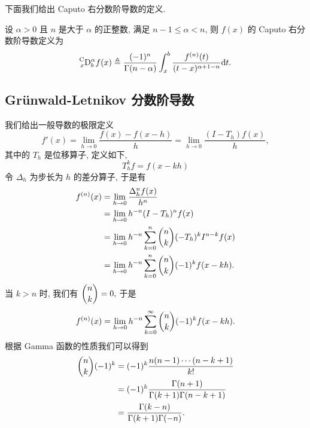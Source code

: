 \documentclass{ecnumaster}
\begin{document}
下面我们给出 Caputo 右分数阶导数的定义.
\begin{definition}
  设 $\alpha > 0$ 且 $n$ 是大于 $\alpha$ 的正整数,
  满足 $n - 1 \le \alpha < n$,   则 $f(x)$ 的 Caputo 右分数阶导数定义为
  $$
    \prescript{{\mathrm{C}}}{x} {\mathrm{D}}_b^{\alpha} f(x)
    \triangleq \frac{(-1)^n}{\Gamma (n-\alpha)}
    \int _x^b \frac{f^{(n)}(t)}{(t-x)^{\alpha + 1 - n}} \mathrm{d}t.
  $$
\end{definition}

\subsection{Gr\"unwald-Letnikov 分数阶导数}
我们给出一般导数的极限定义
\begin{equation}\nonumber
  f'(x) = \lim _{h \to 0} \frac{f(x) - f(x-h)}{h} = \lim _{h \to 0}\frac{(I - T_h)f(x)}{h},
\end{equation}
其中的 $T_h$ 是位移算子, 定义如下,
\begin{equation}\nonumber
  T_h^k f = f(x-kh)
\end{equation}
令 $\Delta _h$ 为步长为 $h$ 的差分算子, 于是有
\begin{equation}
  \begin{split}\nonumber
  f^{(n)}(x) &= \lim _{h \to 0}\frac{\Delta _h^n f(x)}{h^n}\\
             &= \lim _{h \to 0} h^{-n}(I - T_h)^n f(x)\\
             &= \lim _{h \to 0} h^{-n} \sum _{k=0}^{n} \dbinom{n}{k} (-T_h)^k I^{n-k}f(x)\\
             &= \lim _{h \to 0} h^{-n} \sum _{k=0}^{n} \dbinom{n}{k} (-1)^k f(x-kh).
  \end{split}
\end{equation}
当 $k > n$ 时, 我们有 $\dbinom{n}{k} = 0,$
于是
\begin{equation}\nonumber
  f^{(n)}(x) = \lim _{h \to 0} h^{-n} \sum _{k=0}^{\infty} \dbinom{n}{k} (-1)^k f(x - kh).
\end{equation}
根据 Gamma 函数的性质我们可以得到
\begin{equation}
  \begin{split}\nonumber
    \dbinom{n}{k}(-1)^k &= (-1)^k \frac{n(n-1)\cdots(n-k+1)}{k!}\\
                        &= (-1)^k \frac{\Gamma (n+1)}{\Gamma(k+1)\Gamma(n-k+1)}\\
                        &= \frac{\Gamma (k-n)}{\Gamma (k+1) \Gamma (-n)}.
  \end{split}
\end{equation}
\end{document}
